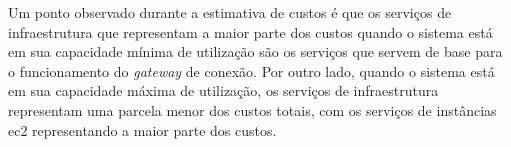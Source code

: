 Um ponto observado durante a estimativa de custos é que os serviços de infraestrutura que representam a maior parte dos custos quando o sistema está em sua capacidade mínima de utilização são os serviços que servem de base para o funcionamento do \textit{gateway} de conexão. Por outro lado, quando o sistema está em sua capacidade máxima de utilização, os serviços de infraestrutura representam uma parcela menor dos custos totais, com os serviços de instâncias \gls{ec2} representando a maior parte dos custos.